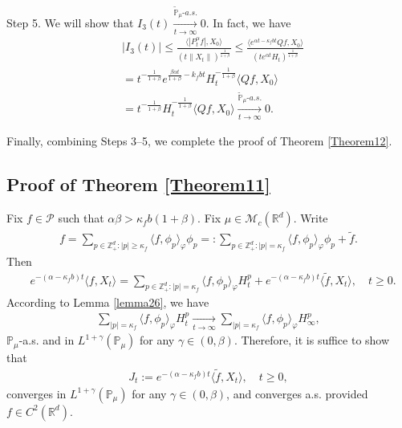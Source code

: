 \documentclass[12pt,a4paper]{amsart}
\theoremstyle{plain}
\theoremstyle{definition}
\numberwithin{equation}{section}
\begin{document}
	Step 5. We will show that $I_3(t) \xrightarrow[t\to \infty]{\tilde {\mathbb P}_\mu \text{-} a.s.} 0$.
In fact, we have
\begin{equation}\begin{split}
	&|I_3(t)|
\leq \frac{\langle |P^\alpha_tf|,X_0\rangle}{(t\|X_t\|)^{\frac{1}{1+\beta}}}
	\leq \frac{\langle e^{\alpha t - \kappa_f b t}Qf,X_0\rangle}{(te^{\alpha t} H_t)^{\frac{1}{1+\beta}}}
	\\& = t^{-\frac{1}{1+\beta}} e^{\frac{\beta \alpha t}{1+\beta} - k_fbt} H_t^{-\frac{1}{1+\beta}} \langle Qf,X_0\rangle
	\\& = t^{-\frac{1}{1+\beta}} H_t^{-\frac{1}{1+\beta}} \langle Qf,X_0\rangle
	\xrightarrow[t\to \infty]{\tilde {\mathbb P}_\mu \text{-} a.s.} 0.
\end{split}\end{equation}

	Finally, combining Steps 3--5, we complete the proof of Theorem \ref{Theorem12}.

\subsection{Proof of Theorem \ref{Theorem11}}
	Fix  $f \in \mathcal P$ such that $\alpha \beta > \kappa_f b (1+\beta)$.
	Fix $\mu \in \mathcal M_c(\mathbb R^d)$.
	Write
\begin{equation}\begin{split}
    f
    =\sum_{p\in \mathbb Z_+^d:|p|\geq \kappa_f}\langle f,\phi_p\rangle_\varphi \phi_p
    =:
    \sum_{p\in \mathbb Z_+^d:|p|= \kappa_f}\langle f,\phi_p\rangle_\varphi \phi_p+\tilde{f}.
\end{split}\end{equation}
	Then
\begin{align*}
    &e^{-(\alpha-\kappa_fb)t}\langle f,X_t\rangle=
    \sum_{p\in \mathbb Z_+^d:|p|= \kappa_f}\langle f,\phi_p\rangle_\varphi H_t^p+e^{-(\alpha-\kappa_fb)t} \langle \tilde{f},X_t\rangle,
    \quad t\geq 0.
\end{align*}
	According to Lemma \ref{lemma26},
	we have
\begin{equation}\begin{split}
\label{as convergence}
     \sum_{|p|= \kappa_f}\langle f,\phi_p\rangle_\varphi H_t^p
     \xrightarrow[t\to \infty]{} \sum_{|p|=\kappa_f}\langle f, \phi_p\rangle_{\varphi} H_{\infty}^p,
\end{split}\end{equation}
$\mathbb{P}_{\mu}$-a.s. and in $L^{1+\gamma}(\mathbb{P}_{\mu})$ for any $\gamma\in(0,\beta)$.
	Therefore, it is suffice to show that
\begin{equation}\begin{split}
    J_t
    :=e^{-(\alpha-\kappa_fb)t}\langle \tilde{f},X_t\rangle,
    \quad t\geq 0,
\end{split}\end{equation}
	converges in $L^{1+\gamma}(\mathbb{P}_{\mu})$ for any $\gamma\in(0,\beta)$, and converges a.s. provided $f\in C^2(\mathbb R^d)$.
\end{document}
